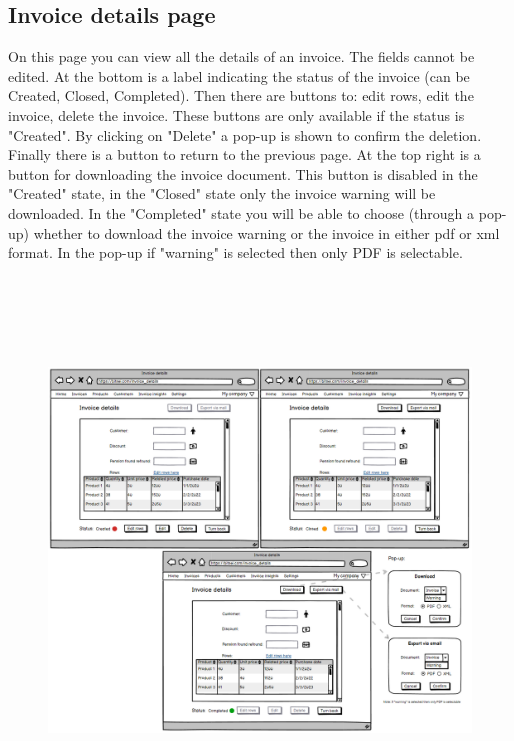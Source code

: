 \subsection{Invoice details page}
On this page you can view all the details of an invoice. The fields cannot be edited. At the bottom is a label indicating the status of the invoice (can be Created, Closed, Completed). Then there are buttons to: edit rows, edit the invoice, delete the invoice. These buttons are only available if the status is "Created". By clicking on "Delete" a pop-up is shown to confirm the deletion. Finally there is a button to return to the previous page.
At the top right is a button for downloading the invoice document. This button is disabled in the "Created" state, in the "Closed" state only the invoice warning will be downloaded. In the "Completed" state you will be able to choose (through a pop-up) whether to download the invoice warning or the invoice in either pdf or xml format. In the pop-up if "warning" is selected then only PDF is selectable.
\begin{figure}[h!]
    \centering
    \includegraphics[height=410pt, keepaspectratio]{resources/mockup/Invoice_details.png}
\end{figure}
\newpage

